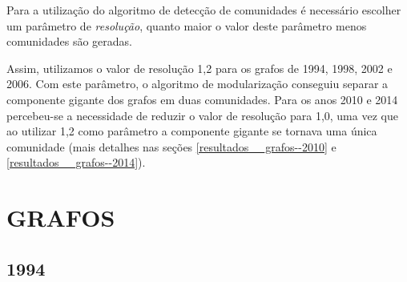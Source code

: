 Para a utilização do algoritmo de detecção de comunidades é necessário escolher um parâmetro de \emph{resolução}, quanto maior o valor deste parâmetro menos comunidades são geradas.

Assim, utilizamos o valor de resolução 1,2 para os grafos de 1994, 1998, 2002 e 2006. Com este parâmetro, o algoritmo de modularização conseguiu separar a componente gigante dos grafos em duas comunidades. Para os anos 2010 e 2014 percebeu-se a necessidade de reduzir o valor de resolução para 1,0, uma vez que ao utilizar 1,2 como parâmetro a componente gigante se tornava uma única comunidade (mais detalhes nas seções \ref{resultados__grafos--2010} e \ref{resultados__grafos--2014}).

\section{\texorpdfstring{\MakeUppercase{Grafos}}{}}
\label{resultados__grafos}


\subsection{1994}
\label{resultados__grafos--1994}

